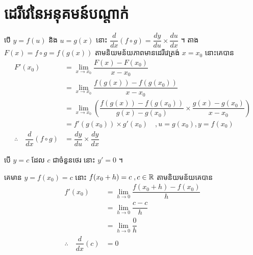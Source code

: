 \documentclass[a4paper,12pt]{article}
\begin{document}
\section{ដេរីវេនៃអនុគមន៍បណ្តាក់}
បើ $y=f(u)$ និង $u=g(x)$ នោះ $\dfrac{d}{dx}(f \circ g)=\dfrac{dy}{du}\times \dfrac{du}{dx}$ ។
\solution តាង $F(x)=f\circ g=f(g(x))$  តាមនិយមន័យភាពមានដេរីវេត្រង់ $x=x_0$ នោះគេបាន
\begin{align*}
	F'(x_0)                                  & =\lim_{x\to x_0}\dfrac{F(x)-F(x_0)}{x-x_0}                                                             \\
	                                         & =\lim _{x\to x_0}\dfrac{f(g(x))-f(g(x_0))}{x-x_0}                                                      \\
	                                         & =\lim_{x\to x_0}\left( \dfrac{f(g(x))-f(g(x_0))}{g(x)-g(x_0)} \times \dfrac{g(x)-g(x_0)}{x-x_0}\right) \\
	                                         & =f'(g(x_0))\times g'(x_0)\quad,u=g(x_0),y=f(x_0)                                                       \\
	\therefore \quad \dfrac{d}{dx}(f\circ g) & =\dfrac{dy}{du}\times \dfrac{dy}{dx}
\end{align*}

\begin{general}
	បើ $y=c$ ដែល $c$ ជាចំនួនថេរ នោះ $y'=0$ ។
\end{general}
\solution
គេមាន $y=f(x_0)=c$ នោះ $f(x_0+h)=c \;, c\in \mathbb{R}$
តាមនិយមន័យគេបាន
\begin{align*}
	f'(x_0)                           & =\lim_{h\to 0}\dfrac{f(x_0+h)-f(x_0)}{h} \\
	                                  & =\lim_{h\to 0}\dfrac{c-c}{h}             \\
	                                  & =\lim_{h\to 0}\dfrac{0}{h}               \\
	\therefore \quad \dfrac{d}{dx}(c) & =0
\end{align*}
\end{document}
